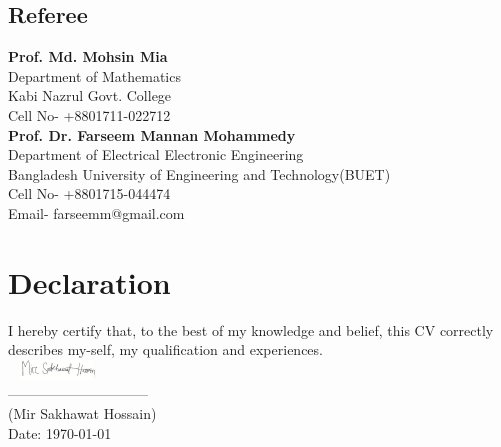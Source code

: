 \documentclass[a4paper]{twentysecondcv} %
\begin{document}
\subsection{Referee}
\textbf{Prof. Md. Mohsin Mia}\\
Department of Mathematics\\
Kabi Nazrul Govt. College\\
Cell No- +8801711-022712\\

\textbf{Prof. Dr. Farseem Mannan Mohammedy}\\
Department of Electrical Electronic Engineering\\
Bangladesh University of Engineering and Technology(BUET)\\
Cell No- +8801715-044474\\
Email- farseemm@gmail.com\\


\section{Declaration}


I hereby certify that, to the best of my knowledge and belief, this CV correctly\\ describes my-self, my qualification and experiences.\\

\includegraphics[height=20px,width=100px]{signature.jpg}\\
------------------------------\\
(Mir Sakhawat Hossain)\\
Date: \today


\end{document}
